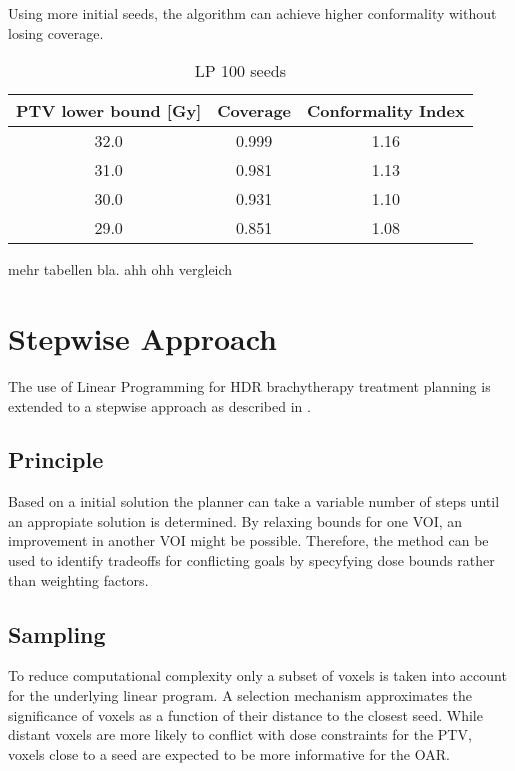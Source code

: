 \documentclass[USenglish,twocolumn]{article}
\begin{document}
Using more initial seeds, the algorithm can achieve higher conformality without losing coverage.

				\begin{table}[h]
			\centering		
		 	\caption{LP 100 seeds}
		 	\label{table:LP_results100}
			\begin{tabular}{ccc}
			PTV lower bound [Gy] 	& Coverage 	& Conformality Index\\	\hline
				32.0 	& 0.999		& 1.16\\
				31.0 	& 0.981 	& 1.13\\
				30.0 	& 0.931		& 1.10\\		
				29.0 	& 0.851		& 1.08\\
			\end{tabular}
		\end{table}

mehr tabellen bla. ahh ohh vergleich		
		
\section{Stepwise Approach}
The use of Linear Programming for HDR brachytherapy treatment planning is extended to a stepwise approach as described in \citep{3}.

	\subsection{Principle}
		Based on a initial solution the planner can take a variable number of steps until an appropiate solution is determined. By relaxing bounds for one VOI, an improvement in another VOI might be possible. Therefore, the method can be used to identify tradeoffs for conflicting goals by specyfying dose bounds rather than weighting factors.

	\subsection{Sampling}
		To reduce computational complexity only a subset of voxels is taken into account for the underlying linear program. A selection mechanism approximates the significance of voxels as a function of their distance to the closest seed.
		While distant voxels are more likely to conflict with dose constraints for the PTV, voxels close to a seed are expected to be more informative for the OAR.  
	
\end{document}
